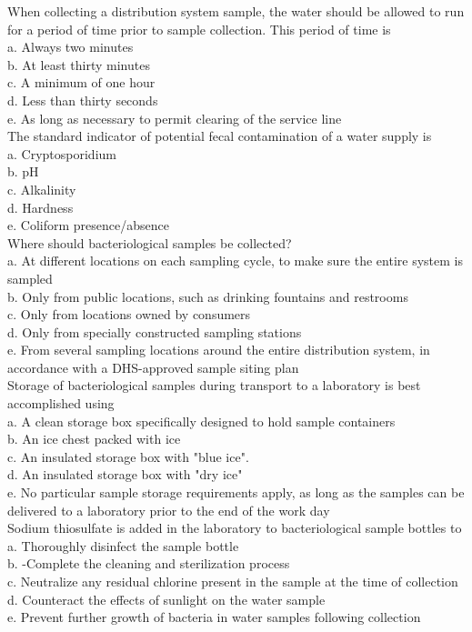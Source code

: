 When collecting a distribution system sample, the water should be allowed to run for a period of time prior to sample collection. This period of time is\\
a. Always two minutes\\
b. At least thirty minutes\\
c. A minimum of one hour\\
d. Less than thirty seconds\\
e. As long as necessary to permit clearing of the service line\\

 The standard indicator of potential fecal contamination of a water supply is\\
a. Cryptosporidium\\
b. pH\\
c. Alkalinity\\
d. Hardness\\
e. Coliform presence/absence\\

Where should bacteriological samples be collected?\\
a. At different locations on each sampling cycle, to make sure the entire system is sampled\\
b. Only from public locations, such as drinking fountains and restrooms\\
c. Only from locations owned by consumers\\
d. Only from specially constructed sampling stations\\
e. From several sampling locations around the entire distribution system, in accordance with a DHS-approved sample siting plan\\

Storage of bacteriological samples during transport to a laboratory is best accomplished using\\
a. A clean storage box specifically designed to hold sample containers\\
b. An ice chest packed with ice\\
c. An insulated storage box with "blue ice".\\
d. An insulated storage box with "dry ice"\\
e. No particular sample storage requirements apply, as long as the samples can be delivered to a laboratory prior to the end of the work day\\

Sodium thiosulfate is added in the laboratory to bacteriological sample bottles to\\
a. Thoroughly disinfect the sample bottle\\
b. -Complete the cleaning and sterilization process\\
c. Neutralize any residual chlorine present in the sample at the time of collection\\
d. Counteract the effects of sunlight on the water sample\\
e. Prevent further growth of bacteria in water samples following collection\\

